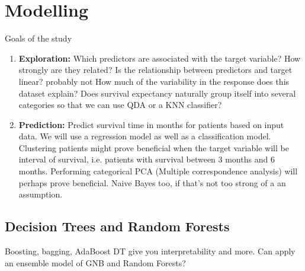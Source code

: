 \documentclass[a4paper]{article}
\begin{document}
\section{Modelling}
Goals of the study
\begin{enumerate}
\item \textbf{Exploration:}
Which predictors are associated with the target variable?	
How strongly are they related?
Is the relationship between predictors and target linear? probably not
How much of the variability in the response does this dataset explain?
Does survival expectancy naturally group itself into several categories so that we can use
QDA or a KNN classifier?
%
\item \textbf{Prediction:} Predict survival time in months for patients based on input data. We will use a regression model as well as a classification model. Clustering patients might prove beneficial when the target variable will be interval of survival, i.e. patients with survival between 3 months and 6 months. Performing categorical PCA (Multiple correspondence analysis) will perhaps prove beneficial. Naive Bayes too, if that's not too strong of a an assumption. 
\end{enumerate}

\subsection{Decision Trees and Random Forests}
Boosting, bagging, AdaBoost
DT give you interpretability and more. Can apply an ensemble model of GNB and Random Forests?




































%
\end{document}
